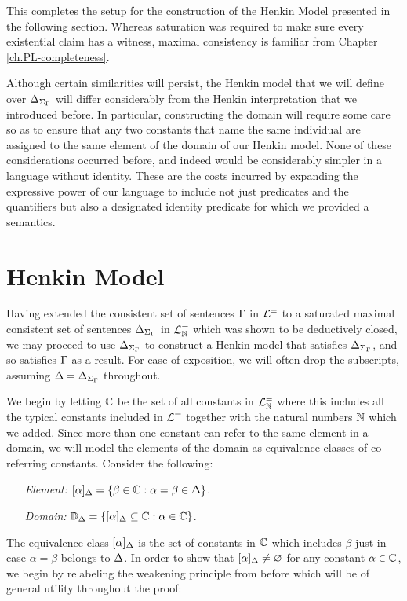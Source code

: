 This completes the setup for the construction of the Henkin Model presented in the following section.
Whereas saturation was required to make sure every existential claim has a witness, maximal consistency is familiar from Chapter \ref{ch.PL-completeness}.

Although certain similarities will persist, the Henkin model that we will define over $\Delta_{\Sigma_{\Gamma}}$ will differ considerably from the Henkin interpretation that we introduced before. 
In particular, constructing the domain will require some care so as to ensure that any two constants that name the same individual are assigned to the same element of the domain of our Henkin model.
None of these considerations occurred before, and indeed would be considerably simpler in a language without identity.
These are the costs incurred by expanding the expressive power of our language to include not just predicates and the quantifiers but also a designated identity predicate for which we provided a semantics.





\section{Henkin Model}%
  \label{sub:HenkinModel}

Having extended the consistent set of sentences $\Gamma$ in $\mathcal{L}^{=}$ to a saturated maximal consistent set of sentences $\Delta_{\Sigma_{\Gamma}}$ in $\mathcal{L}^{=}_{\mathbb{N}}$ which was shown to be deductively closed, we may proceed to use $\Delta_{\Sigma_{\Gamma}}$ to construct a Henkin model that satisfies $\Delta_{\Sigma_{\Gamma}}$, and so satisfies $\Gamma$ as a result.
For ease of exposition, we will often drop the subscripts, assuming $\Delta=\Delta_{\Sigma_{\Gamma}}$ throughout.

We begin by letting $\mathbb{C}$ be the set of all constants in $\mathcal{L}^{=}_{\mathbb{N}}$ where this includes all the typical constants included in $\mathcal{L}^{=}$ together with the natural numbers $\mathbb{N}$ which we added. 
Since more than one constant can refer to the same element in a domain, we will model the elements of the domain as equivalence classes of co-referring constants.
Consider the following:
  \begin{enumerate}[leftmargin=1.5in]
    \item[\it Element:] $[\alpha]_{\Delta}=\lbrace\beta\in\mathbb{C} : \alpha=\beta\in\Delta\rbrace$.
    \item[\it Domain:] $\mathbb{D}_{\Delta}=\lbrace[\alpha]_{\Delta} \subseteq \mathbb{C} : \alpha\in\mathbb{C}\rbrace$.
  \end{enumerate}
The equivalence class $[\alpha]_{\Delta}$ is the set of constants in $\mathbb{C}$ which includes $\beta$ just in case $\alpha=\beta$ belongs to $\Delta$.
In order to show that $[\alpha]_{\Delta}\neq\varnothing$ for any constant $\alpha\in\mathbb{C}$, we begin by relabeling the weakening principle from before which will be of general utility throughout the proof:





